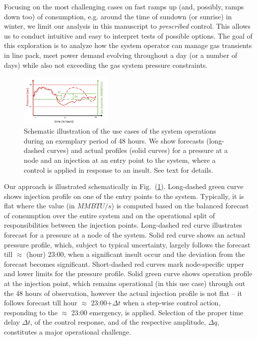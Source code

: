 Focusing on the most challenging cases on fast ramps up (and, possibly, ramps down too) of consumption, e.g. around the time of sundown (or sunrise) in winter, we limit our analysis in this manuscript to \emph{prescribed} control. This allows us to conduct intuitive and easy to interpret tests of possible options. The goal of  this exploration is to analyze how the system operator can manage gas transients in line pack, meet power demand evolving throughout a day (or a number of days)  while also not exceeding the gas system pressure constraints. 

\begin{figure}
    \centering
    \includegraphics[width=0.4\textwidth]{figs/schematic.pdf}
    \caption{ Schematic illustration of the use cases of the system operations during an exemplary period of 48 hours. We show forecasts (long-dashed curves) and actual profiles (solid curves) for a pressure at a node and an injection at an entry point to the system,  where a control is applied in response to an insult. See text for details.
    \label{fig:schematic}}
\end{figure}

Our approach is illustrated schematically in Fig.~(\ref{fig:schematic}). Long-dashed green curve shows injection profile on one of the entry points to the system.  Typically,  it is flat where the value (in $MMBTU/s$) is computed based on the balanced forecast of consumption over the entire system and on the operational split of responsibilities between the injection points. Long-dashed red curve illustrates  forecast for a pressure at a node of the system.  Solid red curve shows an actual pressure profile,  which,  subject to typical uncertainty, largely follows the forecast till $\approx$ (hour) 23:00, when a significant insult occur and the deviation from the forecast becomes significant. Short-dashed red curves mark node-specific upper and lower limits for the pressure profile. Solid green curve shows operation profile at the injection point, which remains operational (in this use case) through out the 48 hours of observation, however the actual injection profile is not flat -- it follows forecast till hour $\approx$ 23:00+$\Delta t$ when a step-wise control action, responding to the $\approx$ 23:00 emergency, is applied. Selection of the proper time delay $\Delta t$, of the control response, and of the respective amplitude, $\Delta q$, constitutes a major operational challenge. 

